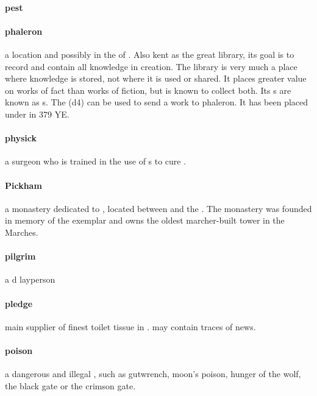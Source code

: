 \paragraph{pest} 
\paragraph{phaleron} a location and possibly  in the  of . Also kent as the great library, its goal is to record and contain all knowledge in creation. The library is very much a place where knowledge is stored, not where it is used or shared. It places greater value on works of fact than works of fiction, but is known to collect both. Its s are known as s. The   (d4) can be used to send a work to phaleron. It has been placed under  in 379 YE.
\paragraph{physick} a surgeon who is trained in the use of s to cure .
\paragraph{Pickham} a monastery dedicated to , located between  and the . The monastery was founded in memory of the exemplar  and owns the oldest marcher-built tower in the Marches.
\paragraph{pilgrim} a d layperson
\paragraph{pledge} main supplier of finest toilet tissue in . may contain traces of news.
\paragraph{poison} a dangerous and illegal , such as gutwrench, moon's poison, hunger of the wolf, the black gate or the crimson gate.
